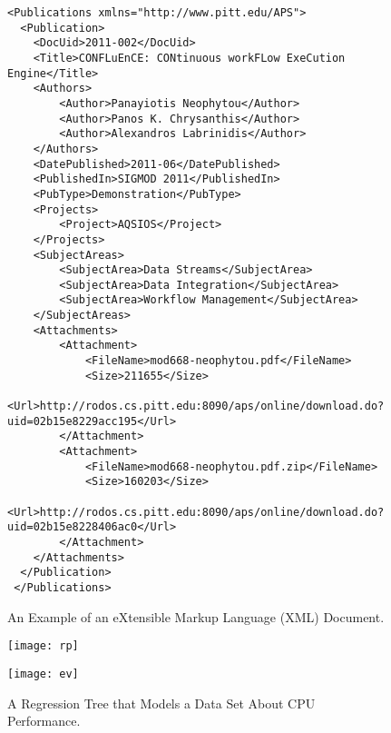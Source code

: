 \documentclass[12pt]{article}
\begin{document}
\begin{figure}[p]

\vspace*{-.5in}

\centering

{\footnotesize 
\begin{verbatim}
<Publications xmlns="http://www.pitt.edu/APS">
  <Publication>
    <DocUid>2011-002</DocUid>
    <Title>CONFLuEnCE: CONtinuous workFLow ExeCution Engine</Title>
    <Authors>
        <Author>Panayiotis Neophytou</Author>
        <Author>Panos K. Chrysanthis</Author>
        <Author>Alexandros Labrinidis</Author>
    </Authors>
    <DatePublished>2011-06</DatePublished>
    <PublishedIn>SIGMOD 2011</PublishedIn>
    <PubType>Demonstration</PubType>
    <Projects>
        <Project>AQSIOS</Project>
    </Projects>
    <SubjectAreas>
        <SubjectArea>Data Streams</SubjectArea>
        <SubjectArea>Data Integration</SubjectArea>
        <SubjectArea>Workflow Management</SubjectArea>
    </SubjectAreas>
    <Attachments>
        <Attachment>
            <FileName>mod668-neophytou.pdf</FileName>
            <Size>211655</Size>
            <Url>http://rodos.cs.pitt.edu:8090/aps/online/download.do?uid=02b15e8229acc195</Url>
        </Attachment>
        <Attachment>
            <FileName>mod668-neophytou.pdf.zip</FileName>
            <Size>160203</Size>
            <Url>http://rodos.cs.pitt.edu:8090/aps/online/download.do?uid=02b15e8228406ac0</Url>
        </Attachment>
    </Attachments>
  </Publication>
 </Publications>
\end{verbatim} }

\caption{An Example of an eXtensible Markup Language (XML) Document.}
\label{figure:xml}
\end{figure}


\begin{figure}[p]
\centering

\vspace*{-.6in}

\begin{center}
\texttt{[image: rp]}
\end{center}

\vspace*{-.75in}

\begin{center}
\texttt{[image: ev]}
\end{center}

\vspace*{-.25in}

\caption{A Regression Tree that Models a Data Set About CPU Performance.}
\label{figure:tree}
\vspace*{-.25in}
\end{figure}
\end{document}
